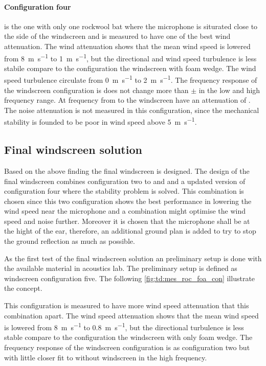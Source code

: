 \paragraph{Configuration four} is the one with only one rockwool bat where the microphone is siturated close to the side of the windscreen and is measured to have one of the best wind attenuation. The wind attenuation shows that the mean wind speed is lowered from \SI{8}{\meter\per\second} to \SI{1}{\meter\per\second}, but the directional and wind speed turbulence is less stabile compare to the configuration the windscreen with foam wedge. The wind speed turbulence circulate from \SI{0}{\meter\per\second} to \SI{2}{\meter\per\second}. The frequency response of the windscreen configuration is does not change more than $\pm$ in the low and high frequency range. At frequency from  to  the windscreen have an attenuation of . The noise attenuation is not measured in this configuration, since the mechanical stability is founded to be poor in wind speed above \SI{5}{\meter\per\second}.


\subsection{Final windscreen solution}
Based on the above finding the final windscreen is designed. The design of the final windscreen combines configuration two to and and a updated version of configuration four where the stability problem is solved. This combination is chosen since this two configuration shows the best performance in lowering the wind speed near the microphone and a combination might optimise the wind speed and noise further. Moreover it is chosen that the microphone shall be at the hight of the ear, therefore, an additional ground plan is added to try to stop the ground reflection as much as possible. 

As the first test of the final windscreen solution an preliminary setup is done with the available material in acoustics lab. The preliminary setup is defined as windscreen configuration five. The following \autoref{fig:td:mes_roc_foa_con} illustrate the concept.


This configuration is measured to have more wind speed attenuation that this combination apart. The wind speed attenuation shows that the mean wind speed is lowered from \SI{8}{\meter\per\second} to \SI{0.8}{\meter\per\second}, but the directional turbulence is less stable compare to the configuration the windscreen with only foam wedge. The frequency response of the windscreen configuration is as configuration two but with little closer fit to without windscreen in the high frequency.

